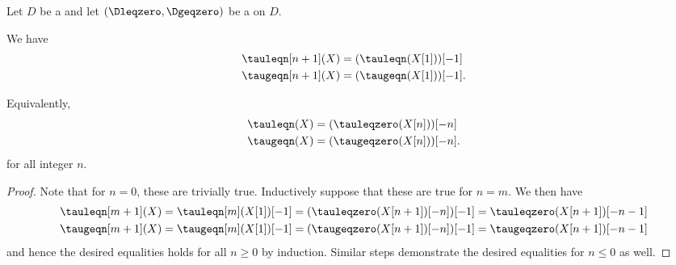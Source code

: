 \begin{lemma} \label{lemma:shifted_truncation_functors}

    Let $D$ be a  and let $(\Dleqzero, \Dgeqzero)$ be a  on $D$.

    We have
    \begin{align*}
    \tauleqn[n+1](X) &= (\tauleqn(X[1]))[-1] \\
    \taugeqn[n+1](X) &= (\taugeqn (X[1]))[-1].
    \end{align*}

    Equivalently, 
    \begin{align*}
    \tauleqn(X) &= (\tauleqzero(X[n]))[-n] \\
    \taugeqn(X) &= (\taugeqzero(X[n]))[-n].
    \end{align*}
    for all integer $n$.
\end{lemma}

\begin{proof}
Note that for $n = 0$, these are trivially true. Inductively suppose that these are true for $n = m$. We then have 
\begin{align*}
    \tauleqn[m+1](X) &= \tauleqn[m](X[1])[-1] = (\tauleqzero(X[n+1])[-n])[-1] = \tauleqzero(X[n+1])[-n-1] \\
    \taugeqn[m+1](X) &= \taugeqn[m](X[1])[-1] = (\taugeqzero(X[n+1])[-n])[-1] = \taugeqzero(X[n+1])[-n-1]
\end{align*}
and hence the desired equalities holds for all $n \geq 0$ by induction. Similar steps demonstrate the desired equalities for $n \leq 0$ as well. 
\end{proof}
